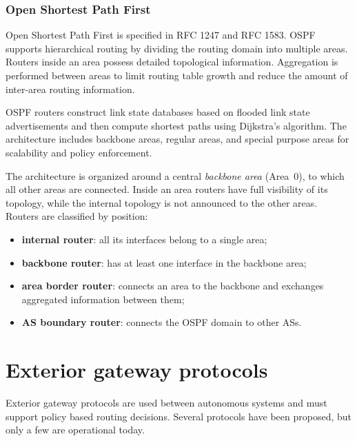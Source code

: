 \subsubsection*{Open Shortest Path First}

Open Shortest Path First is specified in RFC 1247 and RFC 1583. OSPF supports hierarchical routing by dividing the routing domain into multiple areas. Routers inside an area possess detailed topological information. Aggregation is performed between areas to limit routing table growth and reduce the amount of inter-area routing information.

OSPF routers construct link state databases based on flooded link state advertisements and then compute shortest paths using Dijkstra's algorithm. The architecture includes backbone areas, regular areas, and special purpose areas for scalability and policy enforcement.


\begin{center}
\end{center}

The architecture is organized around a central \emph{backbone area} (Area~0), to which all other
areas are connected. Inside an area routers have full visibility of its topology, while the
internal topology is not announced to the other areas. Routers are classified by position:
\begin{itemize}
	\item \textbf{internal router}: all its interfaces belong to a single area;
	\item \textbf{backbone router}: has at least one interface in the backbone area;
	\item \textbf{area border router}: connects an area to the backbone and exchanges
	aggregated information between them;
	\item \textbf{AS boundary router}: connects the OSPF domain to other ASs.
\end{itemize}

\section{Exterior gateway protocols}

Exterior gateway protocols are used between autonomous systems and must support policy based routing decisions. Several protocols have been proposed, but only a few are operational today.

